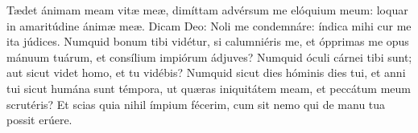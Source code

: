 Tædet ánimam meam vitæ meæ, dimíttam advérsum me elóquium meum:
	loquar in amaritúdine ánimæ meæ.
Dicam Deo: Noli me condemnáre:
	índica mihi cur me ita júdices.
Numquid bonum tibi vidétur, si calumniéris me, et ópprimas me opus mánuum tuárum,
	et consílium impiórum ádjuves?
Numquid óculi cárnei tibi sunt;
	aut sicut videt homo, et tu vidébis?
Numquid sicut dies hóminis dies tui, et anni tui sicut humána sunt témpora,
	ut quæras iniquitátem meam, et peccátum meum scrutéris?
Et scias quia nihil ímpium fécerim, cum sit nemo qui de manu tua possit erúere.
